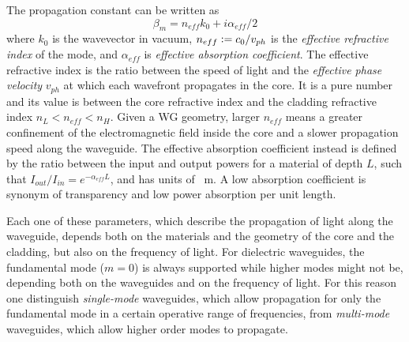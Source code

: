 The propagation constant can be written as
\begin{equation}
\beta_m = n_{eff} k_0 + i \alpha_{eff}/2
\end{equation}
where $k_0$ is the wavevector in vacuum, $n_{eff} \vcentcolon= c_0/v_{ph}$ is the \textit{effective refractive index} of the mode, and $\alpha_{eff}$ is \textit{effective absorption coefficient}.
The effective refractive index is the ratio between the speed of light and the \textit{effective phase velocity} $v_{ph}$ at which each wavefront propagates in the core.
It is a pure number and its value is between the core refractive index and the cladding refractive index $n_L < n_{eff} < n_H$.
Given a WG geometry, larger $n_{eff}$ means a greater confinement of the electromagnetic field inside the core and a slower propagation speed along the waveguide.
The effective absorption coefficient instead is defined by the ratio between the input and output powers for a material of depth $L$, such that $I_{out}/I_{in}=e^{-\alpha_{eff}L}$, and has units of \si{\per\m}.
A low absorption coefficient is synonym of transparency and low power absorption per unit length.



Each one of these parameters, which describe the propagation of light along the waveguide, depends both on the materials and the geometry of the core and the cladding, but also on the frequency of light.
For dielectric waveguides, the fundamental mode ($m=0$) is always supported while higher modes might not be, depending both on the waveguides and on the frequency of light.
For this reason one distinguish \textit{single-mode} waveguides, which allow propagation for only the fundamental mode in a certain operative range of frequencies, from \textit{multi-mode} waveguides, which allow higher order modes to propagate.

